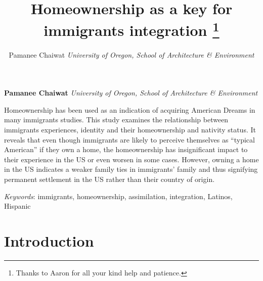 \documentclass[11pt,]{article}
\title{Homeownership as a key for immigrants integration \thanks{Thanks to Aaron for all your kind help and patience.}  }
\author{\Large Pamanee Chaiwat\vspace{0.05in} \newline\normalsize\emph{University of Oregon, School of Architecture \& Environment}  }
\date{}
\newcommand*{\authorfont}{\fontfamily{phv}\selectfont}
\renewenvironment{abstract}
 {{%
    \setlength{\leftmargin}{0mm}
    \setlength{\rightmargin}{\leftmargin}%
  }%
  \relax}
 {\endlist}
\begin{document}
	
%
\setcounter{page}{1}


{%
\setlength{\parindent}{0pt}
\thispagestyle{plain}
{\fontsize{18}{20}\selectfont\raggedright 
\maketitle  %

}

{
   \vskip 13.5pt\relax \normalsize\fontsize{11}{12} 
\textbf{\authorfont Pamanee Chaiwat} \hskip 15pt \emph{\small University of Oregon, School of Architecture \& Environment}   

}

}







\begin{abstract}

    \hbox{\vrule height .2pt width 39.14pc}

    \vskip 8.5pt %

\noindent Homeownership has been used as an indication of acquiring American
Dreams in many immigrants studies. This study examines the relationship
between immigrants experiences, identity and their homeownership and
nativity status. It reveals that even though immigrants are likely to
perceive themselves as ``typical American'' if they own a home, the
homeownership has insignificant impact to their experience in the US or
even worsen in some cases. However, owning a home in the US indicates a
weaker family ties in immigrants' family and thus signifying permanent
settlement in the US rather than their country of origin.


\vskip 8.5pt \noindent \emph{Keywords}: immigrants, homeownership, assimilation, integration, Latinos, Hispanic \par

    \hbox{\vrule height .2pt width 39.14pc}



\end{abstract}


\vskip 6.5pt

\noindent  \hypertarget{introduction}{%
\section{Introduction}\label{introduction}}
\end{document}
